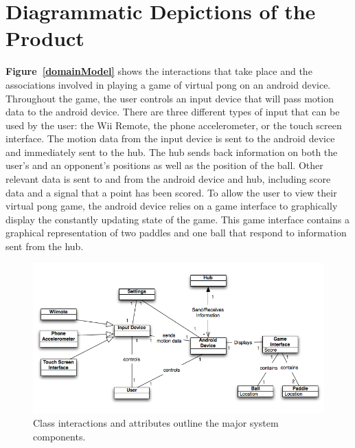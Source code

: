 \documentclass[12pt]{article}
\begin{document}
\section{Diagrammatic Depictions of the Product}
\label{sec:diagrams}
\textbf{Figure~\ref{domainModel}} shows the interactions that take place and the associations involved in playing a game of virtual pong on an android device.  Throughout the game, the user controls an input device that will pass motion data to the android device.  There are three different types of input that can be used by the user: the Wii Remote, the phone accelerometer, or the touch screen interface.  The motion data from the input device is sent to the android device and immediately sent to the hub.  The hub sends back information on both the user's and an opponent's positions as well as the position of the ball.  Other relevant data is sent to and from the android device and hub, including score data and a signal that a point has been scored.  To allow the user to view their virtual pong game, the android device relies on a game interface to graphically display the constantly updating state of the game.  This game interface contains a graphical representation of two paddles and one ball that respond to information sent from the hub.
\begin{figure}
\begin{center}
\includegraphics[scale=.7]{DomainModel.png}
\caption{\label{Domain Model} Class interactions and attributes outline the major system components.}
\end{center}
\end{figure}
\end{document}
